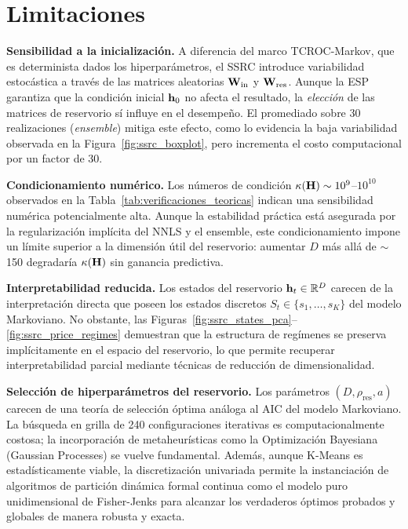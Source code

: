 \section{Limitaciones}
\label{sec:ssrc_limitaciones}

\textbf{Sensibilidad a la inicialización.}  A diferencia del marco
TCROC-Markov, que es determinista dados los hiperparámetros, el SSRC
introduce variabilidad estocástica a través de las matrices aleatorias
$\mathbf{W}_{\text{in}}$ y $\mathbf{W}_{\text{res}}$.  Aunque la ESP
garantiza que la condición inicial $\mathbf{h}_0$ no afecta el
resultado, la \emph{elección} de las matrices de reservorio sí
influye en el desempeño.  El promediado sobre 30 realizaciones
(\textit{ensemble}) mitiga este efecto, como lo evidencia la baja
variabilidad observada en la Figura~\ref{fig:ssrc_boxplot}, pero
incrementa el costo computacional por un factor de 30.

\textbf{Condicionamiento numérico.}  Los números de condición
$\kappa(\mathbf{H}) \sim 10^{9}$--$10^{10}$ observados en la
Tabla~\ref{tab:verificaciones_teoricas} indican una sensibilidad
numérica potencialmente alta.  Aunque la estabilidad práctica está
asegurada por la regularización implícita del NNLS y el ensemble,
este condicionamiento impone un límite superior a la dimensión
útil del reservorio: aumentar $D$ más allá de $\sim$150 degradaría
$\kappa(\mathbf{H})$ sin ganancia predictiva.

\textbf{Interpretabilidad reducida.}  Los estados del reservorio
$\mathbf{h}_t \in \mathbb{R}^D$ carecen de la interpretación directa
que poseen los estados discretos $S_t \in \{s_1, \ldots, s_K\}$ del
modelo Markoviano.  No obstante, las
Figuras~\ref{fig:ssrc_states_pca}--\ref{fig:ssrc_price_regimes}
demuestran que la estructura de regímenes se preserva implícitamente
en el espacio del reservorio, lo que permite recuperar
interpretabilidad parcial mediante técnicas de reducción de
dimensionalidad.

\textbf{Selección de hiperparámetros del reservorio.}  Los parámetros
$(D, \rho_{\text{res}}, a)$ carecen de una teoría de selección
óptima análoga al AIC del modelo Markoviano.  La búsqueda en grilla de 240 configuraciones iterativas es computacionalmente costosa; la incorporación de metaheurísticas como la Optimización Bayesiana (Gaussian Processes) se vuelve fundamental. Además, aunque K-Means es estadísticamente viable, la discretización univariada permite la instanciación de algoritmos de partición dinámica formal continua como el modelo puro unidimensional de Fisher-Jenks para alcanzar los verdaderos óptimos probados y globales de manera robusta y exacta.

